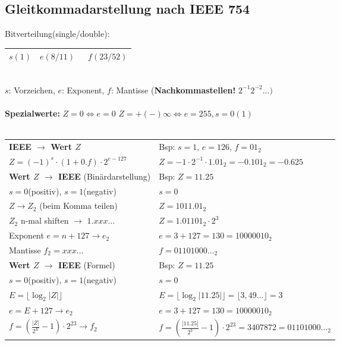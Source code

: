\documentclass[6pt,a4paper]{scrartcl}
\newcommand{\abs}[1]{\ensuremath{\left\vert#1\right\vert}} 							%
\begin{document}
\begin{multicols*}{3}
	\subsection{Gleitkommadarstellung nach IEEE 754}
	Bitverteilung(single/double):\\
	\begin{tabular}{|c|c|c|} \hline
		$s(1)$ & \quad $e(8/11)$ \quad\qquad & \qquad\qquad\qquad\ $f(23/52)$ \qquad\qquad\qquad\qquad \\ \hline
	\end{tabular} \\[0.5em]
	$s$: Vorzeichen, $e$: Exponent, $f$: Mantisse (\textbf{Nachkommastellen!} $2^{-1}2^{-2}...)$ \\ \\
	\textbf{Spezialwerte:} $Z = 0 \Leftrightarrow e=0$ \qquad $Z = + (-)\infty \Leftrightarrow e=255, s=0(1)$ \\ \\
	\begin{tabular}{l|p{4.5cm}}
		\textbf{IEEE $\rightarrow$ Wert $Z$} & Bsp: $s = 1$, $e = 126$, $f = 01_2$\\
		$Z = (-1)^s \cdot  (1+0.f) \cdot 2^{e-127}$ & $Z=-1 \cdot 2^{-1} \cdot 1.01_2 = -0.101_2= -0.625$ \\ \midrule
		\textbf{Wert $Z$ $\rightarrow$ IEEE} (Binärdarstellung) & Bsp: $Z=11.25$ \\
		$s=0$(positiv), $s=1$(negativ) & $s=0$\\
		$Z \rightarrow Z_2$ (beim Komma teilen) & $Z = 1011.01_2$\\
		$Z_2$ n-mal shiften $\rightarrow$ $1.xxx\dots$ & $Z=1.01101_2\cdot 2^3$ \\
		Exponent $e=n+127 \rightarrow e_2$ & $e=3+127=130=10000010_2$\\
		Mantisse $f_2=xxx\dots$ & $f=01101000\dots_2$ \\ \midrule
		\textbf{Wert $Z$ $\rightarrow$ IEEE} (Formel) & Bsp: $Z=11.25$ \\
		$s=0$(positiv), $s=1$(negativ) & $s=0$\\
		$E=\lfloor \log_2\abs{Z}\rfloor$ & $E=\lfloor \log_2\abs{11.25}\rfloor=\lfloor3,49\dots\rfloor=3$\\
		$e=E+127 \rightarrow e_2$ & $e=3+127=130=10000010_2$\\
		$f=\left(\frac{\abs{Z}}{2^E}-1\right) \cdot 2^{23} \rightarrow f_2$  & $f=\left(\frac{\abs{11.25}}{2^3}-1\right)\cdot 2^{23}=3407872= 01101000\dots_2 $
	\end{tabular}


\end{multicols*}
\end{document}
